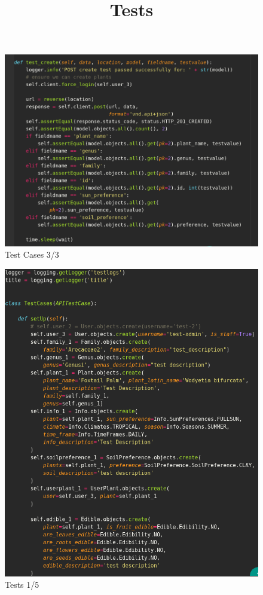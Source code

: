 \documentclass{article}
\begin{document}
\begin{center}
      \begin{figure}[!htb]
          \centering
          \caption{Test Cases 3/3}
          \includegraphics[scale=0.50]{testcase3}
      \end{figure}
      \newpage
      \title{Tests}
      \begin{figure}[!htb]
          \centering
          \caption{Tests 1/5}
          \includegraphics[scale=0.50]{test1}
      \end{figure}
  

\end{center}
\end{document}

